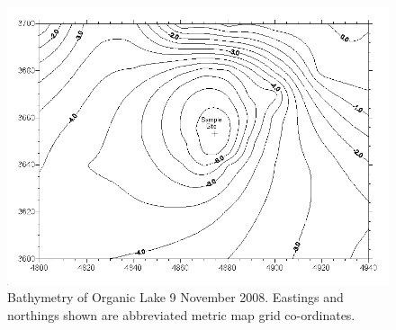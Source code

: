 \begin{figure}
\includegraphics[width=\textwidth]{orglake_figures/bathymetry.jpg}
\caption[Bathymetry of Organic Lake]{Bathymetry of Organic Lake 9 November 2008. Eastings and northings shown are abbreviated metric map grid co-ordinates.}
\label{fig:bathymetry}

\end{figure}
